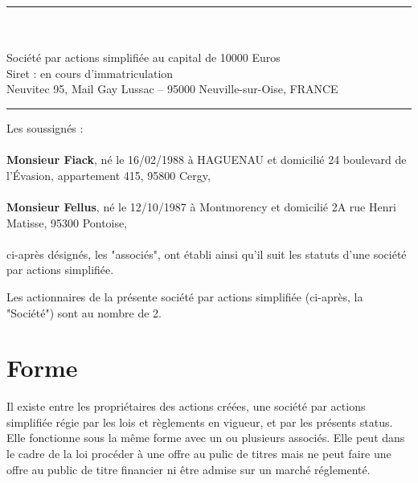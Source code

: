 \documentclass[a4paper,12pt]{report}
\newcommand{\address}{Neuvitec 95, Mail Gay Lussac -- 95000 Neuville-sur-Oise, FRANCE}
\newcommand{\lfAddress}{24 boulevard de l'Évasion, appartement 415, 95800 Cergy}
\newcommand{\jfAddress}{2A rue Henri Matisse, 95300 Pontoise}
\begin{document}


\begin{center}
	\begin{minipage}{0.8\linewidth}
		\center
		\rule{\linewidth}{0.5mm}\\
		\large{}\\
		\normalsize
		Société par actions simplifiée au capital de 10000 Euros\\
		Siret : en cours d'immatriculation\\
		\normalsize{\address}\\
		\rule{\linewidth}{0.5mm}
	\end{minipage}
\end{center}
\vspace{5mm}
\noindent Les soussignés :\\\\
\textbf{Monsieur Fiack}, né le 16/02/1988 à HAGUENAU et domicilié \lfAddress,\\\\
\textbf{Monsieur Fellus}, né le 12/10/1987 à Montmorency et domicilié \jfAddress,\\\\
ci-après désignés, les "associés", ont établi ainsi qu'il suit les statuts d'une société par actions simplifiée.

Les actionnaires de la présente société par actions simplifiée (ci-après, la "Société") sont au nombre de 2.

%
%

\section{Forme}
Il existe entre les propriétaires des actions créées, une société par actions simplifiée régie par les lois et règlements en vigueur, et par les présents status.
Elle fonctionne sous la même forme avec un ou plusieurs associés.
Elle peut dans le cadre de la loi procéder à une offre au pulic de titres mais ne peut faire une offre au public de titre financier ni être admise sur un marché réglementé.
\end{document}
